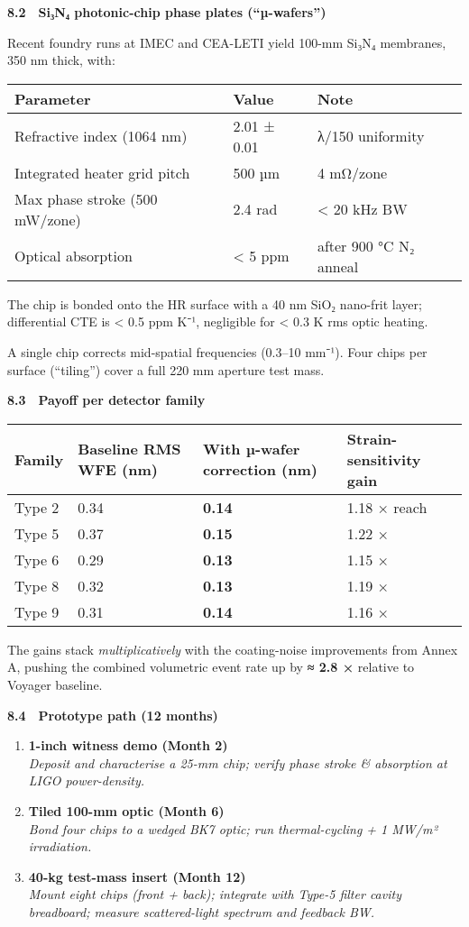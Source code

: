 \documentclass[]{article}
\begin{document}
\textbf{8.2 Si₃N₄ photonic-chip phase plates (``µ-wafers'')}

Recent foundry runs at IMEC and CEA-LETI yield 100-mm Si₃N₄ membranes,
350 nm thick, with:

\begin{longtable}[]{@{}lll@{}}
\toprule
\textbf{Parameter} & \textbf{Value} & \textbf{Note}\tabularnewline
\midrule
\endhead
Refractive index (1064 nm) & 2.01 ± 0.01 & λ/150
uniformity\tabularnewline
Integrated heater grid pitch & 500 µm & 4 mΩ/zone\tabularnewline
Max phase stroke (500 mW/zone) & 2.4 rad & \textless{} 20 kHz
BW\tabularnewline
Optical absorption & \textless{} 5 ppm & after 900 °C N₂
anneal\tabularnewline
\bottomrule
\end{longtable}

The chip is bonded onto the HR surface with a 40 nm SiO₂ nano-frit
layer; differential CTE is \textless{} 0.5 ppm K⁻¹, negligible for
\textless{} 0.3 K rms optic heating.

A single chip corrects mid-spatial frequencies (0.3--10 mm⁻¹). Four
chips per surface (``tiling'') cover a full 220 mm aperture test mass.

\textbf{8.3 Payoff per detector family}

\begin{longtable}[]{@{}llll@{}}
\toprule
\textbf{Family} & \textbf{Baseline RMS WFE (nm)} & \textbf{With µ-wafer
correction (nm)} & \textbf{Strain-sensitivity gain}\tabularnewline
\midrule
\endhead
Type 2 & 0.34 & \textbf{0.14} & 1.18 × reach\tabularnewline
Type 5 & 0.37 & \textbf{0.15} & 1.22 ×\tabularnewline
Type 6 & 0.29 & \textbf{0.13} & 1.15 ×\tabularnewline
Type 8 & 0.32 & \textbf{0.13} & 1.19 ×\tabularnewline
Type 9 & 0.31 & \textbf{0.14} & 1.16 ×\tabularnewline
\bottomrule
\end{longtable}

The gains stack \emph{multiplicatively} with the coating-noise
improvements from Annex A, pushing the combined volumetric event rate up
by \textbf{≈ 2.8 ×} relative to Voyager baseline.

\textbf{8.4 Prototype path (12 months)}

\begin{enumerate}
\def\labelenumi{\arabic{enumi}.}
\item
  \textbf{1-inch witness demo (Month 2)}\\
  \emph{Deposit and characterise a 25-mm chip; verify phase stroke \&
  absorption at LIGO power-density.}
\item
  \textbf{Tiled 100-mm optic (Month 6)}\\
  \emph{Bond four chips to a wedged BK7 optic; run thermal-cycling + 1
  MW/m² irradiation.}
\item
  \textbf{40-kg test-mass insert (Month 12)}\\
  \emph{Mount eight chips (front + back); integrate with Type-5 filter
  cavity breadboard; measure scattered-light spectrum and feedback BW.}
\end{enumerate}
\end{document}
